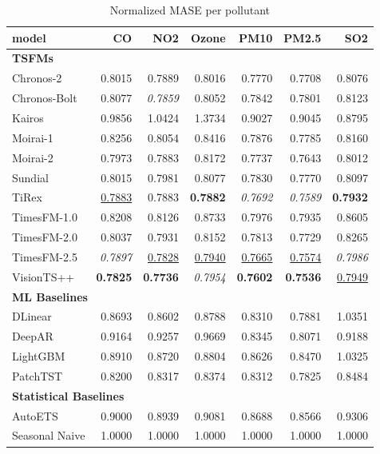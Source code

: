 \begin{table}[H]
\caption{Normalized MASE per pollutant}
\centering
\begin{small}
\begin{tabular}{lrrrrrr}
\toprule
model & CO & NO2 & Ozone & PM10 & PM2.5 & SO2 \\
\midrule
\multicolumn{7}{l}{\textbf{TSFMs}} \\
Chronos-2 & 0.8015 & 0.7889 & 0.8016 & 0.7770 & 0.7708 & 0.8076 \\
Chronos-Bolt & 0.8077 & \textit{0.7859} & 0.8052 & 0.7842 & 0.7801 & 0.8123 \\
Kairos & 0.9856 & 1.0424 & 1.3734 & 0.9027 & 0.9045 & 0.8795 \\
Moirai-1 & 0.8256 & 0.8054 & 0.8416 & 0.7876 & 0.7785 & 0.8160 \\
Moirai-2 & 0.7973 & 0.7883 & 0.8172 & 0.7737 & 0.7643 & 0.8012 \\
Sundial & 0.8015 & 0.7981 & 0.8077 & 0.7830 & 0.7770 & 0.8097 \\
TiRex & \underline{0.7883} & 0.7883 & \textbf{0.7882} & \textit{0.7692} & \textit{0.7589} & \textbf{0.7932} \\
TimesFM-1.0 & 0.8208 & 0.8126 & 0.8733 & 0.7976 & 0.7935 & 0.8605 \\
TimesFM-2.0 & 0.8037 & 0.7931 & 0.8152 & 0.7813 & 0.7729 & 0.8265 \\
TimesFM-2.5 & \textit{0.7897} & \underline{0.7828} & \underline{0.7940} & \underline{0.7665} & \underline{0.7574} & \textit{0.7986} \\
VisionTS++ & \textbf{0.7825} & \textbf{0.7736} & \textit{0.7954} & \textbf{0.7602} & \textbf{0.7536} & \underline{0.7949} \\
\midrule
\multicolumn{7}{l}{\textbf{ML Baselines}} \\
DLinear & 0.8693 & 0.8602 & 0.8788 & 0.8310 & 0.7881 & 1.0351 \\
DeepAR & 0.9164 & 0.9257 & 0.9669 & 0.8345 & 0.8071 & 0.9188 \\
LightGBM & 0.8910 & 0.8720 & 0.8804 & 0.8626 & 0.8470 & 1.0325 \\
PatchTST & 0.8200 & 0.8317 & 0.8374 & 0.8312 & 0.7825 & 0.8484 \\
\midrule
\multicolumn{7}{l}{\textbf{Statistical Baselines}} \\
AutoETS & 0.9000 & 0.8939 & 0.9081 & 0.8688 & 0.8566 & 0.9306 \\
Seasonal Naive & 1.0000 & 1.0000 & 1.0000 & 1.0000 & 1.0000 & 1.0000 \\
\bottomrule
\end{tabular}
\end{small}
\end{table}